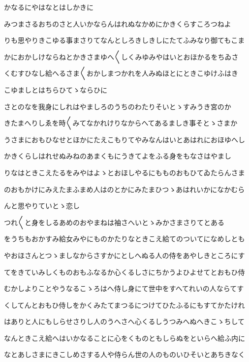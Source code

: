 \documentclass[a4paper,11pt,landscape]{ltjtarticle}
\begin{document}
\par\medskip
かなるにやはなとはしかきに
\par\medskip
みつまさるおちのさと人いかならんはれぬなかめにかきくらすころつねよ
\par\medskip
りも思やりきこゆる事まさりてなんとしろきしきしにたてふみなり御てもこま
\par\medskip
かにおかしけならねとかきさまゆへ〱しくみゆみやはいとおほかるをちゐさ
\par\medskip
くむすひなし給へるさま〱おかしまつかれを人みぬほとにときこゆけふはき
\par\medskip
こゆましとはちらひてゝならひに
\par\medskip
さとのなを我身にしれはやましろのうちのわたりそいとゝすみうき宮のか
\par\medskip
きたまへりしゑを時〱みてなかれけりなからへてあるましき事そとゝさまか
\par\medskip
うさまにおもひなせとほかにたえこもりてやみなんはいとあはれにおほゆへし
\par\medskip
かきくらしはれせぬみねのあまくもにうきてよをふる身をもなさはやまし
\par\medskip
りなはときこえたるをみやはよゝとおほしやるにもものおもひてゐたらんさま
\par\medskip
のおもかけにみえたまふまめ人はのとかにみたまひつゝあはれいかになかむら
\par\medskip
んと思やりていとゝ恋し
\par\medskip
つれ〱と身をしるあめのおやまねは袖さへいとゝみかさまさりてとある
\par\medskip
をうちもおかすみ給女みやにものかたりなときこえ給てのついてになめしとも
\par\medskip
やおほさんとつゝましなからさすかにとしへぬる人の侍をあやしきところにす
\par\medskip
てをきていみしくものおもふなるか心くるしさにちかうよひよせてとおもひ侍
\par\medskip
むかしよりことやうなるこゝろはへ侍し身にて世中をすへてれいの人ならてす
\par\medskip
くしてんとおもひ侍しをかくみたてまつるにつけてひたふるにもすてかたけれ
\par\medskip
はありと人にもしらせさりし人のうへさへ心くるしうつみへぬへきこゝちして
\par\medskip
なんときこえ給へはいかなることに心をくものともしらぬをといらへ給ふ内に
\par\medskip
なとあしさまにきこしめさする人や侍らん世の人のものいひそいとあちきなく
\par\medskip
\end{document}
